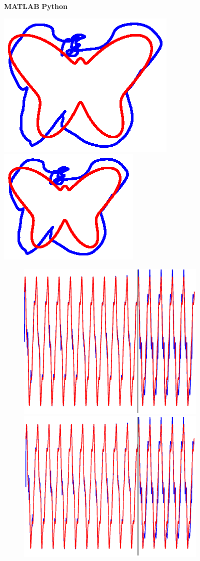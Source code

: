 

\begin{figure}[h]


    \centering
    
    \textbf{MATLAB}\hspace{14em}
    \textbf{Python}
    
    \hspace{-2em}
    \includegraphics[trim=3cm 4cm 3cm 4cm, clip=true, height=.25\linewidth]{Figures/Fig_T7/MATLAB/RMHL_T1_Trajectory.eps}
    \hspace{4em}
    \includegraphics[trim=6.5cm 4.5cm 6cm 4.5cm, clip=true,  height=.25\linewidth]{Figures/Fig_T7/Python/RMHL_T1_Jmat_Trajectory.eps} \\
    
    
    
    
        \textbf{}\begin{subfigure}{\textwidth}
        \centering
        
        \includegraphics[trim=0cm 0cm 0cm 0cm,clip=true,height=0.1\linewidth,width=.45\linewidth]{Figures/Fig_T7/MATLAB/RMHL_T1_CoordinateX.eps}
        \includegraphics[trim=2cm 1cm 2cm 1cm,clip=true,height=0.1\linewidth,width=.45\linewidth]{Figures/Fig_T7/Python/RMHL_T1_Jmat_CoordinateX.eps}\\
    
    \end{subfigure}
    

\end{figure}
